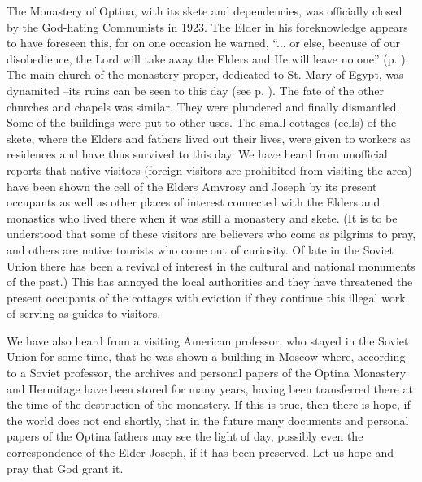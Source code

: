 The Monastery of Optina, with its skete and dependencies, was officially closed by the God-hating Communists in 1923. The Elder in his foreknowledge appears to have foreseen this, for on one occasion he warned, “... or else, because of our disobedience, the Lord will take away the Elders and He will leave no one” (p. \pageref{ch5obedience}). The main church of the monastery proper, dedicated to St. Mary of Egypt, was dynamited --its ruins can be seen to this day (see p. \pageref{saint-mary}). The fate of the other churches and chapels was similar. They were plundered and finally dismantled. Some of the buildings were put to other uses. The small cottages (cells) of the skete, where the Elders and fathers lived out their lives, were given to workers as residences and have thus survived to this day. We have heard from unofficial reports that native visitors (foreign visitors are prohibited from visiting the area) have been shown the cell of the Elders Amvrosy and Joseph by its present occupants as well as other places of interest connected with the Elders and monastics who lived there when it was still a monastery and skete. (It is to be understood that some of these visitors are believers who come as pilgrims to pray, and others are native tourists who come out of curiosity. Of late in the Soviet Union there has been a revival of interest in the cultural and national monuments of the past.) This has annoyed the local authorities and they have threatened the present occupants of the cottages with eviction if they continue this illegal work of serving as guides to visitors.

We have also heard from a visiting American professor, who stayed in the Soviet Union for some time, that he was shown a building in Moscow where, according to a Soviet professor, the archives and personal papers of the Optina Monastery and Hermitage have been stored for many years, having been transferred there at the time of the destruction of the monastery. If this is true, then there is hope, if the world does not end shortly, that in the future many documents and personal papers of the Optina fathers may see the light of day, possibly even the correspondence of the Elder Joseph, if it has been preserved. Let us hope and pray that God grant it.

